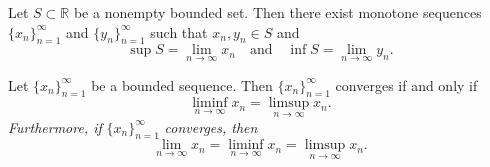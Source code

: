 \documentclass[../main.tex]{subfiles}
\begin{document}
    
    
    
    
    
    
    
    
    
    
    
    
    \begin{exercise}\label{ex: sup inf monotone sequence}
    Let \( S \subset \mathbb{R} \) be a nonempty bounded set. Then there exist monotone sequences \( \{x_n\}_{n=1}^{\infty} \) and \( \{y_n\}_{n=1}^{\infty} \) such that \( x_n, y_n \in S \) and
    \[
    \sup S = \lim_{n \to \infty} x_n \quad \text{and} \quad \inf S = \lim_{n \to \infty} y_n.
    \]
    \end{exercise}
    
    
    
    
    
    
    
    
    
    
    
    
    
    
    
    
    
    
    
    
    
    
    
    
    
    
    
    
    
    
    \begin{proposition} \label{prp: convergence criterion lim inf lim sup}
    Let \( \{x_n\}_{n=1}^{\infty} \) be a bounded sequence. Then \( \{x_n\}_{n=1}^{\infty} \) converges if and only if
    \[
    \liminf_{n \to \infty} x_n = \limsup_{n \to \infty} x_n.
    \]
    \textit{Furthermore, if} \( \{x_n\}_{n=1}^{\infty} \) \textit{converges, then}
    \[
    \lim_{n \to \infty} x_n = \liminf_{n \to \infty} x_n = \limsup_{n \to \infty} x_n.
    \]
    \end{proposition}
    
    
    
    
    
    
    
\end{document}
